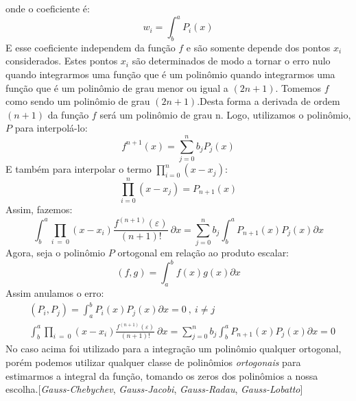 onde o coeficiente é:
\begin{equation}
 w_i =  \int^{a}_b  P_i(x) 
\end{equation}
 E esse coeficiente independem da função $f$ e são somente depende dos pontos $x_i$ considerados. Estes pontos $x_i$ são determinados de modo a tornar o erro nulo quando integrarmos uma função que é um polinômio quando integrarmos uma função que é um polinômio de grau menor ou igual a $(2n +1)$.
 Tomemos $f$ como sendo um polinômio de grau $(2n+1)$.Desta forma a derivada de ordem $(n+1)$ da função $f$ será um polinômio de grau n. Logo, utilizamos o polinômio, $P$ para interpolá-lo:
 \begin{equation}
 f^{n+1}(x) = \sum^{n}_{j = 0} b_j P_j(x)
 \end{equation}
 E também para interpolar o termo $\prod^{n}_{i = 0} (x - x_j)$:
\begin{equation}
 \prod^{n}_{i = 0} (x - x_j) =  P_{n+1}(x)
\end{equation}  
Assim, fazemos:
\begin{equation}
\int^{a}_b \prod_{i\ =\ 0} (x - x_i)\frac{f^{(n+1)}(\varepsilon)}{(n+1)!}\ \partial x = \sum^{n}_{j = 0} b_j \int^{a}_b   P_{n+1}(x) P_j(x) \partial x
\end{equation}
 Agora, seja o polinômio $P$ ortogonal  em relação ao produto escalar:
\begin{equation}
 (f,g) = \int^b_a f(x)g(x) \partial x
\end{equation}
 Assim anulamos o erro:
\begin{align}
&(P_i,P_j) = \int^b_a P_i(x) P_j(x) \partial x = 0\ ,\ i \neq j\\
&\int^{a}_b \prod_{i\ =\ 0} (x - x_i)\frac{f^{(n+1)}(\varepsilon)}{(n+1)!}\ \partial x = \sum^{n}_{j = 0} b_j \int^{a}_b   P_{n+1}(x) P_j(x) \partial x = 0
\end{align}
 No caso acima foi utilizado para a integração um polinômio qualquer ortogonal, porém podemos utilizar qualquer classe de polinômios \emph{ortogonais} para estimarmos a integral da função, tomando os zeros dos polinômios a nossa escolha.[\emph{Gauss-Chebychev}, \emph{Gauss-Jacobi}, \emph{Gauss-Radau}, \emph{Gauss-Lobatto}]
